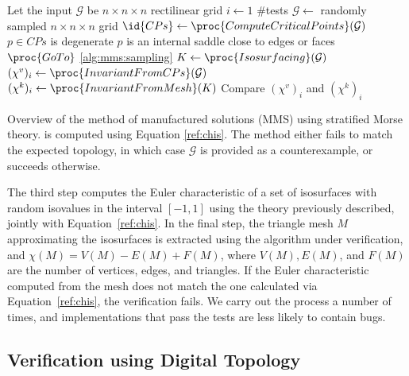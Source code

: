 \begin{algorithm}[b]
\begin{codebox}
\li \Comment Let the input $\mathcal{G}$ be $n \times n \times n$ rectilinear grid
\li \For $i \gets 1$ \To $\#$tests
\li     \Do $\mathcal{G} \gets$ randomly sampled $n \times n \times n$ grid \label{alg:mms:sampling}
\li         $\id{CPs} \gets \proc{ComputeCriticalPoints}(\mathcal{G})$
\li         \If $p \in CPs$ is degenerate 
\li		$p$ is an internal saddle close to edges or faces
\li         	\Then $\proc{GoTo}$ \ref{alg:mms:sampling} \label{alg:mms:goto-smt}
\li         \Else $K \gets \proc{Isosurfacing}(\mathcal{G})$
\li         	  $(\chi^v)_i \gets \proc{InvariantFromCPs}(\mathcal{G})$
\li         	  $(\chi^k)_i \gets \proc{InvariantFromMesh}(K)$
	    \End
\li Compare $(\chi^v)_i$ and $(\chi^k)_i$
      \End
\end{codebox}
\caption{\label{alg:manufactured-solutions-smt}Overview of the method of manufactured solutions (MMS) using
stratified Morse theory.  is computed using Equation
\ref{ref:chis}. The method either fails to match the expected topology, in
which case $\mathcal{G}$ is provided as a counterexample, or
succeeds otherwise.}
\end{algorithm}

The third step computes the Euler characteristic of a set of
isosurfaces with random isovalues in the interval $[-1, 1]$ using the
theory previously described, jointly with Equation~\ref{ref:chis}.  In
the final step, the triangle mesh $M$ approximating the isosurfaces is
extracted using the algorithm under verification, and $\chi(M) = V(M)
- E(M) + F(M)$, where $V(M),E(M)$, and $F(M)$ are the number of
vertices, edges, and triangles. If the Euler characteristic computed
from the mesh does not match the one calculated via
Equation~\ref{ref:chis}, the verification fails. We carry out the
process a number of times, and implementations that pass the tests are
less likely to contain bugs.

\subsection{Verification using Digital Topology}
\label{subsec:ds-verify}


